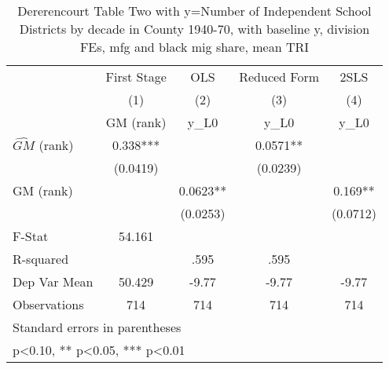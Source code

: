 \begin{table}[htbp]\centering
\def\sym#1{\ifmmode^{#1}\else\(^{#1}\)\fi}
\caption{Dererencourt Table Two with y=Number of Independent School Districts by decade in County 1940-70, with baseline y, division FEs, mfg and black mig share, mean TRI}
\begin{tabular}{l*{4}{c}}
\toprule
                    & First Stage   &         OLS   &Reduced Form   &        2SLS   \\
                    &\multicolumn{1}{c}{(1)}&\multicolumn{1}{c}{(2)}&\multicolumn{1}{c}{(3)}&\multicolumn{1}{c}{(4)}\\
                    &\multicolumn{1}{c}{GM  (rank)}&\multicolumn{1}{c}{y\_L0}&\multicolumn{1}{c}{y\_L0}&\multicolumn{1}{c}{y\_L0}\\
\midrule
$\hat{GM}$ (rank)   &       0.338***&               &      0.0571** &               \\
                    &    (0.0419)   &               &    (0.0239)   &               \\
\addlinespace
GM  (rank)          &               &      0.0623** &               &       0.169** \\
                    &               &    (0.0253)   &               &    (0.0712)   \\
\midrule
F-Stat              &      54.161   &               &               &               \\
R-squared           &               &        .595   &        .595   &               \\
Dep Var Mean        &      50.429   &       -9.77   &       -9.77   &       -9.77   \\
Observations        &         714   &         714   &         714   &         714   \\
\bottomrule
\multicolumn{5}{l}{\footnotesize Standard errors in parentheses}\\
\multicolumn{5}{l}{\footnotesize * p<0.10, ** p<0.05, *** p<0.01}\\
\end{tabular}
\end{table}
